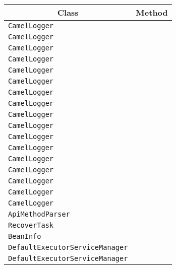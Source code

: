 \begin{center}
\begin{tabular}{ll}\toprule
\multicolumn{1}{c}{Class}&\multicolumn{1}{c}{Method}\\\midrule
\lstinline/CamelLogger/&\raisebox{0pt}{\lstinline/ log(Logger,Marker,String,Throwable)/}\\
\lstinline/CamelLogger/&\raisebox{0pt}{\lstinline/ log(Logger,Marker,String)/}\\
\lstinline/CamelLogger/&\raisebox{0pt}{\lstinline/ log(Logger,String)/}\\
\lstinline/CamelLogger/&\raisebox{0pt}{\lstinline/ log(Logger,Marker,String)/}\\
\lstinline/CamelLogger/&\raisebox{0pt}{\lstinline/ log(Logger,String,Throwable)/}\\
\lstinline/CamelLogger/&\raisebox{0pt}{\lstinline/ log(Logger,String,Throwable)/}\\
\lstinline/CamelLogger/&\raisebox{0pt}{\lstinline/ log(Logger,Marker,String,Throwable)/}\\
\lstinline/CamelLogger/&\raisebox{0pt}{\lstinline/ log(Logger,Marker,String,Throwable)/}\\
\lstinline/CamelLogger/&\raisebox{0pt}{\lstinline/ log(Logger,Marker,String)/}\\
\lstinline/CamelLogger/&\raisebox{0pt}{\lstinline/ log(Logger,String,Throwable)/}\\
\lstinline/CamelLogger/&\raisebox{0pt}{\lstinline/ log(Logger,String)/}\\
\lstinline/CamelLogger/&\raisebox{0pt}{\lstinline/ log(Logger,String)/}\\
\lstinline/CamelLogger/&\raisebox{0pt}{\lstinline/ log(String,Throwable)/}\\
\lstinline/CamelLogger/&\raisebox{0pt}{\lstinline/ booleanprocess(exchange,AsyncCallback)/}\\
\lstinline/CamelLogger/&\raisebox{0pt}{\lstinline/ process(exchange,String)/}\\
\lstinline/CamelLogger/&\raisebox{0pt}{\lstinline/ process(exchange,Throwable)/}\\
\lstinline/CamelLogger/&\raisebox{0pt}{\lstinline/ log(String)/}\\
\lstinline/ApiMethodParser/&\raisebox{0pt}{\lstinline/ intcompare(ApiMethodModel)/}\\
\lstinline/RecoverTask/&\raisebox{0pt}{\lstinline/ run()/}\\
\lstinline/BeanInfo/&\raisebox{0pt}{\lstinline/ createParameterUnmarshalExpressionForAnnotation()/}\\
\lstinline/DefaultExecutorServiceManager/&\raisebox{0pt}{\lstinline/ awaitTermination(ExecutorService)/}\\
\lstinline/DefaultExecutorServiceManager/&\raisebox{0pt}{\lstinline/ doShutdown(ExecutorService,long)/}\\

\bottomrule
\end{tabular}
\end{center}

